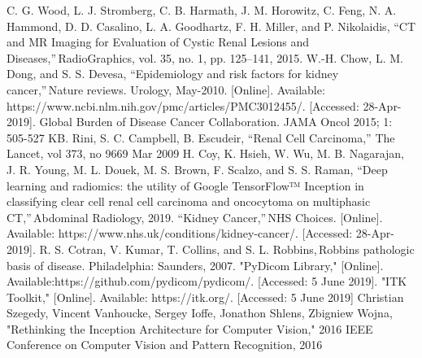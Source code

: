 \documentclass[conference]{IEEEtran}
\begin{document}
%
%
\begin{thebibliography}{00}
 C. G. Wood, L. J. Stromberg, C. B. Harmath, J. M. Horowitz, C. Feng, N. A. Hammond, D. D. Casalino, L. A. Goodhartz, F. H. Miller, and P. Nikolaidis, “CT and MR Imaging for Evaluation of Cystic Renal Lesions and Diseases,” RadioGraphics, vol. 35, no. 1, pp. 125–141, 2015. 
 W.-H. Chow, L. M. Dong, and S. S. Devesa, “Epidemiology and risk factors for kidney cancer,” Nature reviews. Urology, May-2010. [Online]. Available: https://www.ncbi.nlm.nih.gov/pmc/articles/PMC3012455/. [Accessed: 28-Apr-2019]. 
 Global Burden of Disease Cancer Collaboration. JAMA Oncol 2015; 1: 505-527 
 KB. Rini, S. C. Campbell, B. Escudeir, “Renal Cell Carcinoma,” The Lancet, vol 373, no 9669 Mar 2009 
 H. Coy, K. Hsieh, W. Wu, M. B. Nagarajan, J. R. Young, M. L. Douek, M. S. Brown, F. Scalzo, and S. S. Raman, “Deep learning and radiomics: the utility of Google TensorFlow™ Inception in classifying clear cell renal cell carcinoma and oncocytoma on multiphasic CT,” Abdominal Radiology, 2019. 
 “Kidney Cancer,” NHS Choices. [Online]. Available: https://www.nhs.uk/conditions/kidney-cancer/. [Accessed: 28-Apr-2019]. 
 R. S. Cotran, V. Kumar, T. Collins, and S. L. Robbins, Robbins pathologic basis of disease. Philadelphia: Saunders, 2007. 
 "PyDicom Library," [Online]. Available:https://github.com/pydicom/pydicom/. [Accessed: 5 June 2019].
 "ITK Toolkit,"  [Online]. Available: https://itk.org/. [Accessed: 5 June 2019]
 Christian Szegedy, Vincent Vanhoucke, Sergey Ioffe, Jonathon Shlens, Zbigniew Wojna, "Rethinking the Inception Architecture for Computer Vision," 2016 IEEE Conference on Computer Vision and Pattern Recognition, 2016
\end{thebibliography}
\end{document}
